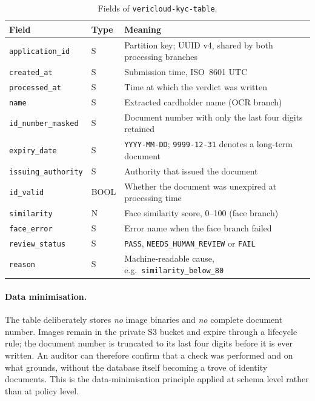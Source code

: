 \begin{table}[htbp]
  \centering
  \small
  \caption{Fields of \texttt{vericloud-kyc-table}.}
  \label{tab:schema}
  \begin{tabular}{@{}llp{6.4cm}@{}}
    \toprule
    Field & Type & Meaning \\
    \midrule
    \texttt{application\_id} & S & Partition key; UUID v4, shared by both processing branches \\
    \texttt{created\_at} & S & Submission time, ISO~8601 UTC \\
    \texttt{processed\_at} & S & Time at which the verdict was written \\
    \texttt{name} & S & Extracted cardholder name (OCR branch) \\
    \texttt{id\_number\_masked} & S & Document number with only the last four digits retained \\
    \texttt{expiry\_date} & S & \texttt{YYYY-MM-DD}; \texttt{9999-12-31} denotes a long-term document \\
    \texttt{issuing\_authority} & S & Authority that issued the document \\
    \texttt{id\_valid} & BOOL & Whether the document was unexpired at processing time \\
    \texttt{similarity} & N & Face similarity score, 0--100 (face branch) \\
    \texttt{face\_error} & S & Error name when the face branch failed \\
    \texttt{review\_status} & S & \texttt{PASS}, \texttt{NEEDS\_HUMAN\_REVIEW} or \texttt{FAIL} \\
    \texttt{reason} & S & Machine-readable cause, e.g.\ \texttt{similarity\_below\_80} \\
    \bottomrule
  \end{tabular}
\end{table}

\paragraph{Data minimisation.}
The table deliberately stores \emph{no} image binaries and \emph{no} complete
document number. Images remain in the private S3 bucket and expire through a
lifecycle rule; the document number is truncated to its last four digits before
it is ever written. An auditor can therefore confirm that a check was performed
and on what grounds, without the database itself becoming a trove of identity
documents. This is the data-minimisation principle applied at schema level rather
than at policy level.


